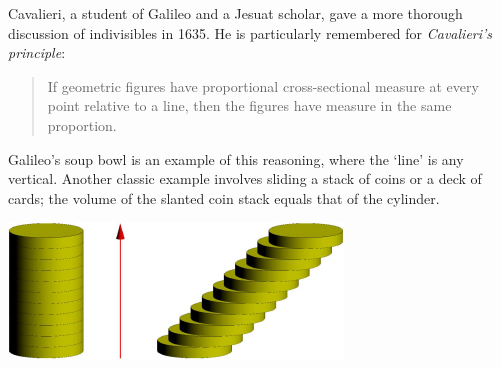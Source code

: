 
Cavalieri, a student of Galileo and a Jesuat scholar, gave a more thorough discussion of indivisibles in 1635. He is particularly remembered for \emph{Cavalieri's principle}:\vspace{-5pt}

\begin{quote}
	If geometric figures have proportional cross-sectional measure at every point relative to a line, then the figures have measure in the same proportion.
\end{quote}

\begin{minipage}[t]{0.62\linewidth}\vspace{-10pt}
	Galileo's soup bowl is an example of this reasoning, where the `line' is any vertical.\smallbreak
	Another classic example involves sliding a stack of coins or a deck of cards; the volume of the slanted coin stack equals that of the cylinder.
\end{minipage}
\hfill
\begin{minipage}[t]{0.37\linewidth}\vspace{-10pt}
	\flushright\includegraphics{analytic-cylinder}
\end{minipage}\medbreak

